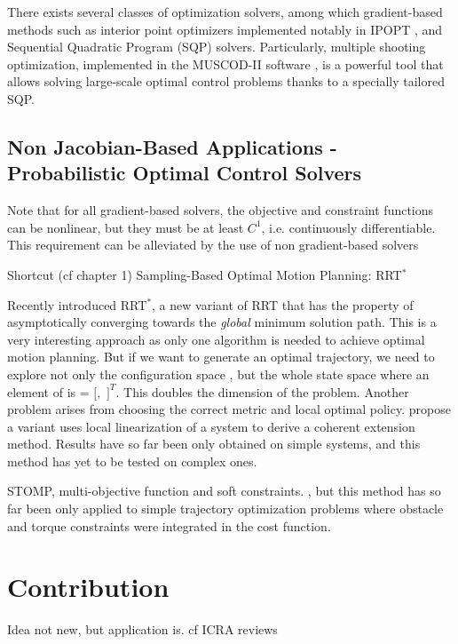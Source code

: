 There exists several classes of optimization solvers, among which
gradient-based methods such as interior point optimizers implemented
notably in \textsc{IPOPT} \cite{Biegler2009}, and Sequential Quadratic Program
(SQP) solvers. Particularly, multiple shooting optimization,
implemented in the \textsc{MUSCOD-II} software
\cite{leineweber2003efficient1, leineweber2003efficient2}, is a
powerful tool that allows solving large-scale optimal control problems
thanks to a specially tailored SQP.

\subsection{Non Jacobian-Based Applications - Probabilistic Optimal Control Solvers}

Note that for all gradient-based solvers, the objective and constraint
functions can be nonlinear, but they must be at least $C^1$,
i.e. continuously differentiable. This requirement can be alleviated
by the use of non gradient-based solvers

Shortcut (cf chapter 1)
Sampling-Based Optimal Motion Planning: RRT$^*$

Recently \cite{Karaman2011} introduced RRT$^*$, a new variant of RRT that
has the property of asymptotically converging towards the \emph{global}
minimum solution path. This is a very interesting approach as only one
algorithm is needed to achieve optimal motion planning. But if we want
to generate an optimal trajectory, we need to explore not only the
configuration space \cspace, but the whole state space
\sspace\thinspace where an element of \sspace\enspace is \state{} =
$[$\config{}$,$ \dotconfig{}$]^T$. This doubles the dimension of the
problem. Another problem arises from choosing the correct metric and
local optimal policy. \cite{Perez2012} propose a variant uses local
linearization of a system to derive a coherent extension
method. Results have so far been only obtained on simple systems, and
this method has yet to be tested on complex ones.

STOMP, multi-objective function and soft constraints.
\cite{Kalakrishnan2011}, but this method has so far been only applied
to simple trajectory optimization problems where obstacle and torque
constraints were integrated in the cost function. 

\section{Contribution}
Idea not new, but application is. cf ICRA reviews

